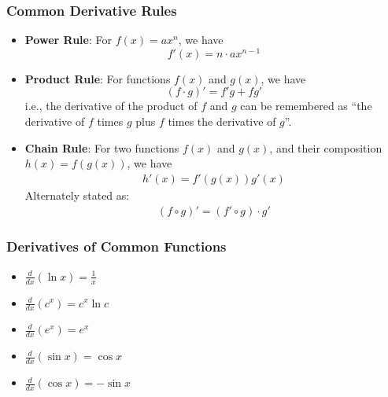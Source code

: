 \documentclass[10pt,a4paper]{article}
\begin{document}
\subsubsection*{Common Derivative Rules}
\begin{itemize}
    \item \textbf{Power Rule}: For $f(x) = ax^n$, we have $$f'(x) = n \cdot a x^{n-1}$$
    \item \textbf{Product Rule}: For functions $f(x)$ and $g(x)$, we have $$(f \cdot g)' = f'g + fg'$$ i.e., the derivative of the product of $f$ and $g$ can be remembered as ``the derivative of $f$ times $g$ plus $f$ times the derivative of $g$''.
    \item \textbf{Chain Rule}: For two functions $f(x)$ and $g(x)$, and their composition $h(x) = f(g(x))$, we have 
    \begin{align*}
        h'(x) = f'(g(x))g'(x)
    \end{align*}  
    Alternately stated as:
    \begin{align*}
        (f \circ g)' = (f' \circ g) \cdot g' 
    \end{align*}
\end{itemize}

\subsubsection*{Derivatives of Common Functions}
\begin{itemize}
    \item $\frac{d}{dx} (\ln{x}) = \frac{1}{x}$
    \item $\frac{d}{dx} (c^x) = c^x \ln{c}$
    \item $\frac{d}{dx} (e^{x}) = {e}^{x}$
    \item $\frac{d}{dx} (\sin{x}) = \cos{x}$
    \item $\frac{d}{dx} (\cos{x}) = -\sin{x}$
\end{itemize}
 
\end{document}
